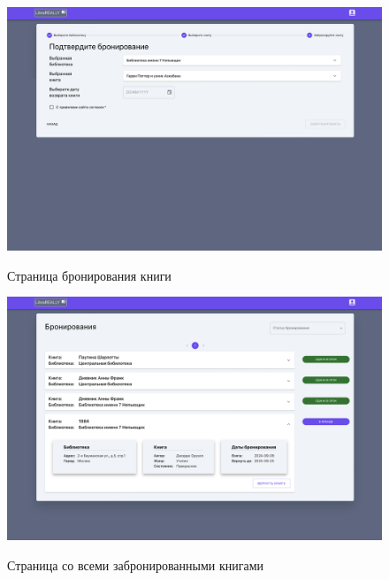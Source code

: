 \begin{figure}[H]
	\begin{center}
		{\includegraphics[scale = 0.25]{../img/design/reserv.png}}
		\caption{Страница бронирования книги}
		\label{fig:design-reserv}
	\end{center}
\end{figure}

\begin{figure}[H]
	\begin{center}
		{\includegraphics[scale = 0.25]{../img/design/all-reservs.png}}
		\caption{Страница со всеми забронированными книгами}
		\label{fig:design-all-reservs}
	\end{center}
\end{figure}

